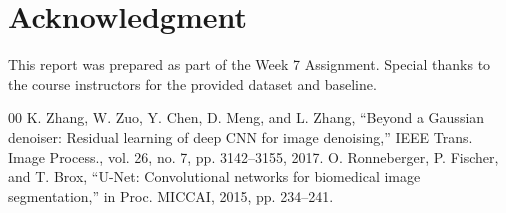 \documentclass[conference]{IEEEtran}
\begin{document}
\section*{Acknowledgment}
This report was prepared as part of the Week 7 Assignment. Special thanks to the course instructors for the provided dataset and baseline.

\begin{thebibliography}{00}
 K. Zhang, W. Zuo, Y. Chen, D. Meng, and L. Zhang, ``Beyond a Gaussian denoiser: Residual learning of deep CNN for image denoising,'' IEEE Trans. Image Process., vol. 26, no. 7, pp. 3142--3155, 2017.
 O. Ronneberger, P. Fischer, and T. Brox, ``U-Net: Convolutional networks for biomedical image segmentation,'' in Proc. MICCAI, 2015, pp. 234--241.
\end{thebibliography}
\end{document}
